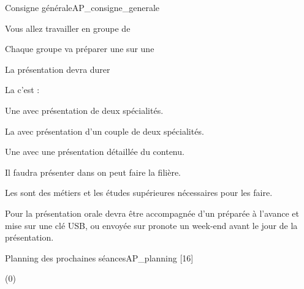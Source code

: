 \teteSndAP


\begin{doc}{Consigne générale}{AP_consigne_generale}
  \begin{listePoints}
    \item Vous allez travailler en groupe de 
    \item Chaque groupe va préparer une  sur une 
    \item La présentation devra durer 
    \item La  c'est :
    \begin{listePoints}
      \item Une  avec présentation de deux spécialités.
      \item La  avec présentation d'un couple de deux spécialités.
      \item Une  avec une présentation détaillée du contenu.
    \end{listePoints}
    \item Il faudra présenter dans  on peut faire la filière.
    \item Les  sont des métiers et les études supérieures nécessaires pour les faire.
  \end{listePoints}

  Pour la présentation orale devra être accompagnée d'un  préparée à l'avance et mise sur une clé USB, ou envoyée sur pronote un week-end avant le jour de la présentation.
\end{doc}

\begin{doc}{Planning des prochaines séances}{AP_planning}
  [16]
  \vspace*{-218 pt}
  
  \begin{programmeSeance}[2]
  \end{programmeSeance}
  \begin{programmeSeance}[2](0)
  \end{programmeSeance}
\end{doc}

